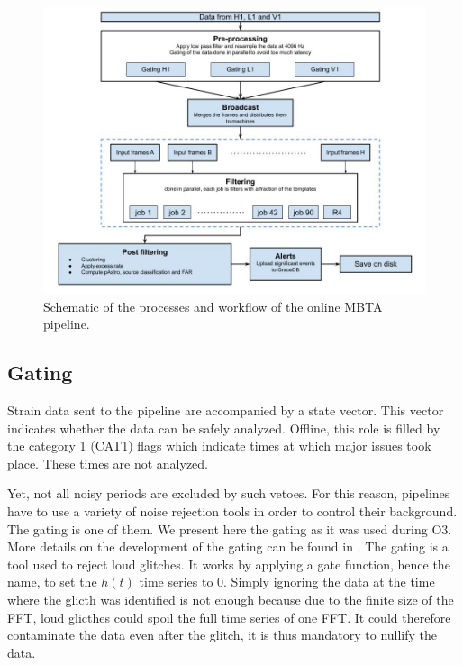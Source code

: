 \begin{figure}
  \centering
  \includegraphics[width=0.65\linewidth]{sectionMBTA/schemaMBTA.jpg}
  \caption{Schematic of the processes and workflow of the online MBTA pipeline.}
  \label{fig:mbta_scheme}
\end{figure}




\subsection{Gating}
\label{sec:gating}

Strain data sent to the pipeline are accompanied by a state vector.
This vector indicates whether the data can be safely analyzed.
Offline, this role is filled by the category 1 (CAT1) flags \cite{cat1_virgo,dq_flag} which indicate times at which major issues took place.
These times are not analyzed.

Yet, not all noisy periods are excluded by such vetoes.
For this reason, pipelines have to use a variety of noise rejection tools in order to control their background.
The gating is one of them.
We present here the gating as it was used during O3.
More details on the development of the gating can be found in \cite{aubin2020}.
The gating is a tool used to reject loud glitches.
It works by applying a gate function, hence the name, to set the $h(t)$ time series to 0.
Simply ignoring the data at the time where the glicth was identified is not enough because due to the finite size of the FFT, loud glicthes could spoil the full time series of one FFT.
It could therefore contaminate the data even after the glitch, it is thus mandatory to nullify the data.

